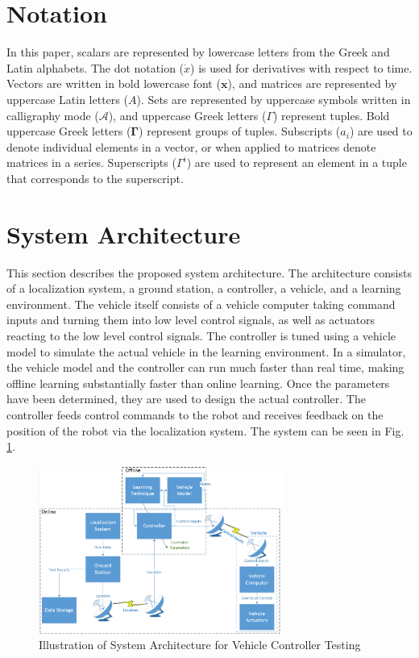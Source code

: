 \documentclass[conference]{IEEEtran}
\begin{document}
\section{Notation} \label{sec:Notation}

In this paper, scalars are represented by lowercase letters from the Greek and Latin alphabets. The dot notation ($\dot{x}$) is used for derivatives with respect to time. Vectors are written in bold lowercase font ($\mathbf{x}$), and matrices are represented by uppercase Latin letters ($A$). Sets are represented by uppercase symbols written in calligraphy mode ($\mathcal{A}$), and uppercase Greek letters ($\Gamma$) represent tuples. Bold uppercase Greek letters ($\mathbf{\Gamma}$) represent groups of tuples. Subscripts ($a_{i}$) are used to denote individual elements in a vector, or when applied to matrices denote matrices in a series. Superscripts ($\Gamma^{i}$) are used to represent an element in a tuple that corresponds to the superscript.

\section{System Architecture} \label{sec:Architecture}

This section describes the proposed system architecture. The architecture consists of a localization system, a ground station, a controller, a vehicle, and a learning environment. The vehicle itself consists of a vehicle computer taking command inputs and turning them into low level control signals, as well as actuators reacting to the low level control signals. The controller is tuned using a vehicle model to simulate the actual vehicle in the learning environment. In a simulator, the vehicle model and the controller can run much faster than real time, making offline learning substantially faster than online learning. Once the parameters have been determined, they are used to design the actual controller. The controller feeds control commands to the robot and receives feedback on the position of the robot via the localization system. The system can be seen in Fig. \ref{fig:Arch}.

\begin{figure}[tb]
\centering
\includegraphics[width=80mm]{Arch.PNG}
\caption{Illustration of System Architecture for Vehicle Controller Testing}
\label{fig:Arch}
\end{figure} 
\end{document}
